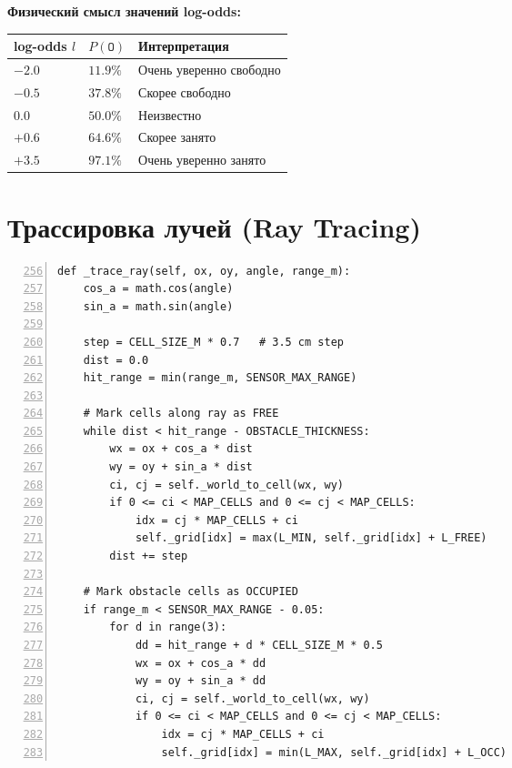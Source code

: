 \textbf{Физический смысл значений log-odds:}

\begin{center}
\begin{tabular}{lll}
\toprule
\textbf{log-odds $l$} & \textbf{$P(\mathtt{O})$} & \textbf{Интерпретация}\\
\midrule
$-2.0$ & $11.9\%$ & Очень уверенно свободно\\
$-0.5$ & $37.8\%$ & Скорее свободно\\
$0.0$  & $50.0\%$ & Неизвестно\\
$+0.6$ & $64.6\%$ & Скорее занято\\
$+3.5$ & $97.1\%$ & Очень уверенно занято\\
\bottomrule
\end{tabular}
\end{center}

\section{Трассировка лучей (Ray Tracing)}

\begin{filebox}[title={\filepath{slam\_map\_node.py}, строки 256--285 --- \_trace\_ray()}]
\begin{lstlisting}[style=pythonstyle, numbers=left, firstnumber=256]
def _trace_ray(self, ox, oy, angle, range_m):
    cos_a = math.cos(angle)
    sin_a = math.sin(angle)

    step = CELL_SIZE_M * 0.7   # 3.5 cm step
    dist = 0.0
    hit_range = min(range_m, SENSOR_MAX_RANGE)

    # Mark cells along ray as FREE
    while dist < hit_range - OBSTACLE_THICKNESS:
        wx = ox + cos_a * dist
        wy = oy + sin_a * dist
        ci, cj = self._world_to_cell(wx, wy)
        if 0 <= ci < MAP_CELLS and 0 <= cj < MAP_CELLS:
            idx = cj * MAP_CELLS + ci
            self._grid[idx] = max(L_MIN, self._grid[idx] + L_FREE)
        dist += step

    # Mark obstacle cells as OCCUPIED
    if range_m < SENSOR_MAX_RANGE - 0.05:
        for d in range(3):
            dd = hit_range + d * CELL_SIZE_M * 0.5
            wx = ox + cos_a * dd
            wy = oy + sin_a * dd
            ci, cj = self._world_to_cell(wx, wy)
            if 0 <= ci < MAP_CELLS and 0 <= cj < MAP_CELLS:
                idx = cj * MAP_CELLS + ci
                self._grid[idx] = min(L_MAX, self._grid[idx] + L_OCC)
\end{lstlisting}
\end{filebox}

